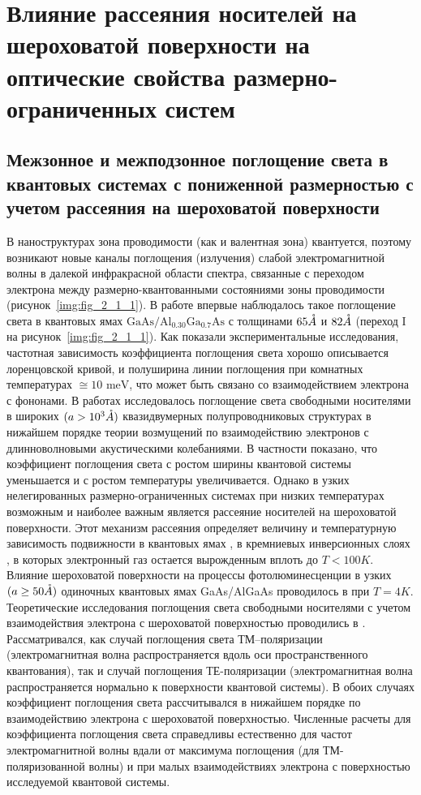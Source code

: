 \chapter{Влияние рассеяния носителей на шероховатой поверхности на оптические свойства размерно-ограниченных систем} \label{chapt2}

\section{Межзонное и межподзонное поглощение света в квантовых системах с пониженной размерностью с учетом рассеяния на шероховатой поверхности} \label{sect2_1}

В наноструктурах зона проводимости (как и валентная зона) квантуется, поэтому возникают новые каналы поглощения (излучения) слабой электромагнитной волны в далекой инфракрасной области спектра, связанные с переходом электрона между размерно-квантованными состояниями зоны проводимости (рисунок~\ref{img:fig_2_1_1}).  В работе \cite{West1985} впервые наблюдалось такое поглощение света в квантовых ямах $\text{GaAs}/\text{Al}_{0.30}\text{Ga}_{0.7}\text{As}$ с толщинами $65 \AA$ и $82 \AA$ (переход I на рисунок~\ref{img:fig_2_1_1}). Как показали экспериментальные исследования, частотная зависимость коэффициента поглощения света хорошо описывается лоренцовской кривой, и полуширина линии поглощения при комнатных температурах $\cong 10 \text{ meV}$, что может быть связано со взаимодействием электрона с фононами. В работах \cite{Wu1994,Spector1983} исследовалось поглощение света свободными носителями в широких $(a > 10^3 \AA)$ квазидвумерных полупроводниковых структурах в нижайшем порядке теории возмущений по взаимодействию электронов с длинноволновыми акустическими колебаниями. В частности показано, что коэффициент поглощения света с ростом ширины квантовой системы уменьшается и с ростом температуры увеличивается. Однако в узких нелегированных размерно-ограниченных системах при низких температурах возможным и наиболее важным является рассеяние носителей на шероховатой поверхности. Этот механизм рассеяния определяет величину и температурную зависимость подвижности в квантовых ямах \cite{Sakaki1987}, в кремниевых инверсионных слоях \cite{Stern1980}, в которых электронный газ остается вырожденным вплоть до $T < 100 K$. Влияние шероховатой поверхности на процессы фотолюминесценции в узких $(a \geq 50 \AA)$ одиночных квантовых ямах GaAs/AlGaAs  проводилось в \cite{Gurioli1991} при $T = 4 K$. Теоретические исследования поглощения света свободными носителями с учетом взаимодействия электрона с шероховатой поверхностью проводились в \cite{Vurgaftman1999}. Рассматривался, как случай поглощения света ТМ–поляризации (электромагнитная волна распространяется вдоль оси пространственного квантования), так и случай поглощения ТЕ-поляризации (электромагнитная волна распространяется нормально к поверхности квантовой системы). В обоих случаях коэффициент поглощения света рассчитывался в нижайшем порядке по взаимодействию электрона с шероховатой поверхностью. Численные расчеты для коэффициента поглощения света справедливы естественно для частот электромагнитной волны вдали от максимума поглощения (для ТМ-поляризованной волны) и при малых взаимодействиях электрона с поверхностью исследуемой квантовой системы.

